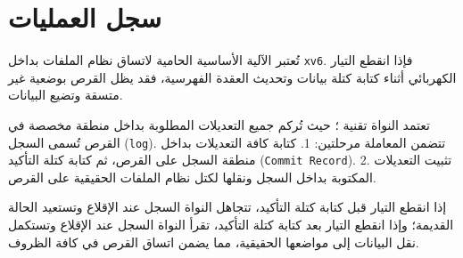 \chapter{سجل العمليات}
\label{chap:log}

تُعتبر  الآلية الأساسية الحامية لاتساق نظام الملفات بداخل \texttt{xv6}.
فإذا انقطع التيار الكهربائي أثناء كتابة كتلة بيانات وتحديث العقدة الفهرسية، فقد يظل القرص بوضعية غير متسقة وتضيع البيانات.

تعتمد النواة تقنية ؛
حيث تُركم جميع التعديلات المطلوبة بداخل منطقة مخصصة في القرص تُسمى السجل (\texttt{log}).
تتضمن المعاملة مرحلتين:
1. كتابة كافة التعديلات بداخل منطقة السجل على القرص، ثم كتابة كتلة التأكيد (\texttt{Commit Record}).
2. تثبيت التعديلات المكتوبة بداخل السجل ونقلها لكتل نظام الملفات الحقيقية على القرص.

إذا انقطع التيار قبل كتابة كتلة التأكيد، تتجاهل النواة السجل عند الإقلاع وتستعيد الحالة القديمة؛
وإذا انقطع التيار بعد كتابة كتلة التأكيد، تقرأ النواة السجل عند الإقلاع وتستكمل نقل البيانات إلى مواضعها الحقيقية، مما يضمن اتساق القرص في كافة الظروف.
